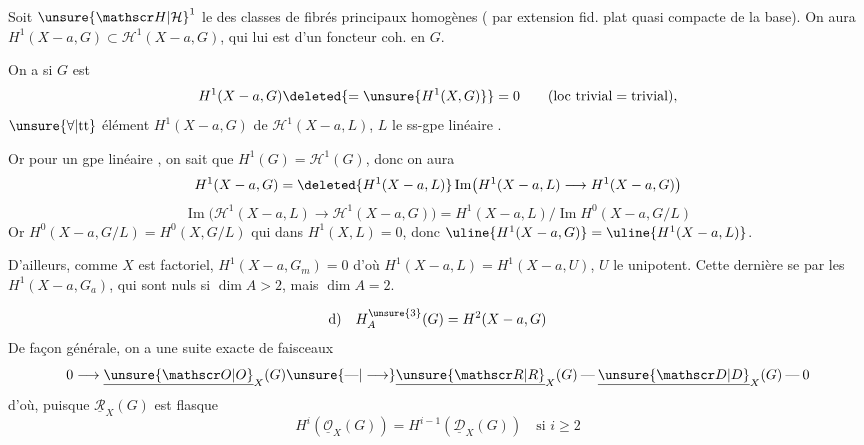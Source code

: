 Soit ${\unsure{\mathscr H|\mathcal H}}^1$ le   des classes de fibrés principaux homogènes ( par extension fid. plat quasi compacte de la base). On aura $H^1(X-a,G)\subset\mathscr H^1(X-a,G)$, qui lui est  d'un foncteur coh. en $G$.

On a si  $G$ est  
\[
H^1(X-a,G)\deleted{=\unsure{H^1(X,G)}}=0\qquad(\text{loc trivial}=\text{trivial}),
\]
 $\unsure{\forall|\text{tt}}$ élément  $H^1(X-a,G)$  de $\mathscr H^1(X-a,L)$, $L$ le ss-gpe linéaire .

Or pour un gpe linéaire , on sait que  $H^1(G)=\mathscr H^1(G)$, donc on  aura
\[
H^1(X-a,G)=\deleted{H^1(X-a,L)}\operatorname{Im}\bigl(H^1(X-a,L)\longrightarrow H^1(X-a,G)\bigr)
\]
\[
\operatorname{Im}\bigl(\mathscr H^1(X-a,L)\longrightarrow\mathscr H^1(X-a,G)\bigr)
=H^1(X-a,L)/\operatorname{Im}H^0(X-a,G/L)
\]
Or $H^0(X-a,G/L)=H^0(X,G/L)$ qui  dans $H^1(X,L)=0$, donc $\uline{\ensuremath{H^1(X-a,G)}}=\uline{\ensuremath{H^1(X-a,L)}}$.

D'ailleurs, comme $X$ est factoriel, $H^1(X-a,G_m)=0$ d'où $H^1(X-a,L)=H^1(X-a,U)$, $U$ le  unipotent. Cette dernière se  par les $H^1(X-a,G_a)$, qui sont nuls si $\dim A>2$, mais    $\dim A=2$.

\[
\text{d)}\quad H_A^{\unsure{3}}(G)=H^2(X-a,G)
\]
De façon générale, on a  une suite exacte de faisceaux
\[
0\longrightarrow\underline{\unsure{\mathscr O|O}}_X(G)\unsure{\mathbin{\text{---}}|\longrightarrow}\underline{\unsure{\mathscr R|R}}_X(G)\mathbin{\text{---}}\underline{\unsure{\mathscr D|D}}_X(G)\mathbin{\text{---}}0
\]
d'où, puisque $\underline{\mathscr R}_X(G)$ est flasque
\[
H^i(\underline{\mathscr O}_X(G))=H^{i-1}(\underline{\mathscr D}_X(G))\quad\text{si }i\geq2
\]
